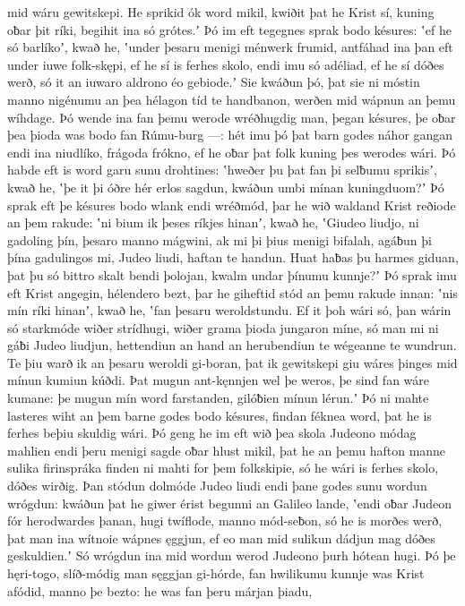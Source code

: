 mid wáru gewitskepi. He sprikid ók word mikil,
kwiðit þat he Krist sí, kuning oƀar þit ríki,
begihit ina só grótes.ʼ Þó im eft tegegnes sprak
bodo késures: ʽef he só barlíkoʼ, kwað he,
ʽunder þesaru menigi ménwerk frumid,
antfáhad ina þan eft under iuwe folk-skępi, ef he sí is ferhes skolo,
endi imu só adéliad, ef he sí dóðes werð,
só it an iuwaro aldrono éo gebiode.ʼ
Sie kwáðun þó, þat sie ni móstin manno nigénumu
an þea hélagon tíd te handbanon,
werðen mid wápnun an þemu wíhdage.
Þó wende ina fan þemu werode wréðhugdig man,
þegan késures, þe oƀar þea þioda was
bodo fan Rúmu-burg —: hét imu þó þat barn godes
náhor gangan endi ina niudlíko,
frágoda frókno, ef he oƀar þat folk kuning
þes werodes wári. Þó habde eft is word garu
sunu drohtines: ʽhweðer þu þat fan þi selƀumu sprikisʼ, kwað he,
ʽþe it þi óðre hér erlos sagdun,
kwáðun umbi mínan kuningduom?ʼ Þó sprak eft þe késures bodo
wlank endi wréðmód, þar he wið waldand Krist
reðiode an þem rakude: ʽni bium ik þeses ríkjes hinanʼ, kwað he,
ʽGiudeo liudjo, ni gadoling þín,
þesaro manno mágwini, ak mi þi þius menigi bifalah,
agáƀun þi þína gadulingos mi, Judeo liudi,
haftan te handun. Huat haƀas þu harmes giduan,
þat þu só bittro skalt bendi þolojan,
kwalm undar þínumu kunnje?ʼ Þó sprak imu eft Krist angegin,
hélendero bezt, þar he giheftid stód
an þemu rakude innan: ʽnis mín ríki hinanʼ, kwað he,
ʽfan þesaru weroldstundu. Ef it þoh wári só,
þan wárin só starkmóde wiðer strídhugi,
wiðer grama þioda jungaron míne,
só man mi ni gáƀi Judeo liudjun,
hettendiun an hand an herubendiun
te wégeanne te wundrun. Te þiu warð ik an þesaru weroldi gi-boran,
þat ik gewitskepi giu wáres þinges
mid mínun kumiun kúðdi. Þat mugun ant-kęnnjen wel
þe weros, þe sind fan wáre kumane: þe mugun mín word farstanden,
gilóƀien mínun lérun.ʼ Þó ni mahte lasteres wiht
an þem barne godes bodo késures,
findan féknea word, þat he is ferhes beþiu
skuldig wári. Þó geng he im eft wið þea skola Judeono
módag mahlien endi þeru menigi sagde
oƀar hlust mikil, þat he an þemu hafton manne
sulika firinspráka finden ni mahti
for þem folkskipie, só he wári is ferhes skolo,
dóðes wirðig. Þan stódun dolmóde
Judeo liudi endi þane godes sunu
wordun wrógdun: kwáðun þat he giwer érist
begunni an Galileo lande, ʽendi oƀar Judeon fór
herodwardes þanan, hugi twíflode,
manno mód-seƀon, só he is morðes werð,
þat man ina wítnoie wápnes ęggjun,
ef eo man mid sulikun dádjun mag dóðes geskuldien.ʼ
Só wrógdun ina mid wordun werod Judeono
þurh hótean hugi. Þó þe hęri-togo,
slíð-módig man sęggjan gi-hórde,
fan hwilikumu kunnje was Krist afódid,
manno þe bezto: he was fan þeru márjan þiadu,

